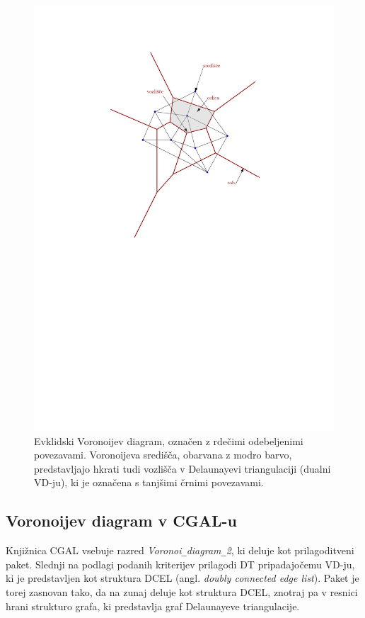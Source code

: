 \documentclass[a4paper, 12pt]{book}
\newcommand{\U}{\texttt{\_}}
\begin{document}
\begin{figure}[htp]
\centerline{\includegraphics[scale=0.8]{pics/voronoi-dt3.pdf}}
\caption{Evklidski Voronoijev diagram, označen z rdečimi odebeljenimi povezavami. Voronoijeva središča, obarvana z modro barvo, predstavljajo hkrati tudi vozlišča v Delaunayevi triangulaciji (dualni VD-ju), ki je označena s tanjšimi črnimi povezavami.}
\label{vd}
\end{figure}

\subsection{Voronoijev diagram v CGAL-u}
Knjižnica CGAL vsebuje razred \textit{Voronoi\U diagram\U 2}, ki deluje kot prilagoditveni paket. Slednji na podlagi podanih kriterijev prilagodi DT pripadajočemu VD-ju, ki je predstavljen kot struktura DCEL (angl. \textit{doubly connected edge list}). Paket je torej zasnovan tako, da na zunaj deluje kot struktura DCEL, znotraj pa v resnici hrani strukturo grafa, ki predstavlja graf Delaunayeve triangulacije.
\end{document}
